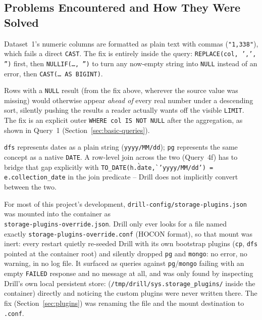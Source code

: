 \documentclass[11pt,a4paper]{article}
\begin{document}
\subsection{Problems Encountered and How They Were Solved}
\begin{description}[leftmargin=1.6em]
  \item[Thousands-separator commas.] Dataset~1's numeric columns are formatted as
    plain text with commas (\texttt{"1,338"}), which fails a direct \texttt{CAST}.
    The fix is entirely inside the query: \texttt{REPLACE(col, ',', '')} first, then
    \texttt{NULLIF(\ldots, '')} to turn any now-empty string into \texttt{NULL}
    instead of an error, then \texttt{CAST(\ldots\ AS BIGINT)}.
  \item[\texttt{NULL} sorts first in \texttt{ORDER BY \ldots DESC}.] Rows with a
    \texttt{NULL} result (from the fix above, wherever the source value was missing)
    would otherwise appear \emph{ahead of} every real number under a descending sort,
    silently pushing the results a reader actually wants off the visible
    \texttt{LIMIT}. The fix is an explicit outer \texttt{WHERE col IS NOT NULL} after
    the aggregation, as shown in Query~1 (Section~\ref{sec:basic-queries}).
  \item[Heterogeneous date types across sources.] \texttt{dfs} represents dates as a
    plain string (\texttt{yyyy/MM/dd}); \texttt{pg} represents the same concept as a
    native \texttt{DATE}. A row-level join across the two (Query~4f) has to bridge
    that gap explicitly with \texttt{TO\_DATE(h.\`date\`, 'yyyy/MM/dd') =
    e.collection\_date} in the join predicate -- Drill does not implicitly convert
    between the two.
  \item[The storage-plugin override file was silently never applied.] For most of
    this project's development, \texttt{drill-config/storage-plugins.json} was
    mounted into the container as\\ \texttt{storage-plugins-override.json}. Drill only
    ever looks for a file named \\ exactly \texttt{storage-plugins-override.conf} (HOCON
    format), so that mount was inert: every restart quietly re-seeded Drill with its
    own bootstrap plugins (\texttt{cp}, \texttt{dfs} pointed at the container root) and
    silently dropped \texttt{pg} and \texttt{mongo}: no error, no warning, in no log
    file. It surfaced as queries against \texttt{pg}/\texttt{mongo} failing with an
    empty \texttt{FAILED} response and no message at all, and was only found by
    inspecting Drill's own local persistent store:
    (\texttt{/tmp/drill/sys.storage\_plugins/} inside the container) directly and
    noticing the custom plugins were never written there. The fix (Section~\ref{sec:plugins})
    was renaming the file and the mount destination to \texttt{.conf}.
\end{description}
\end{document}
